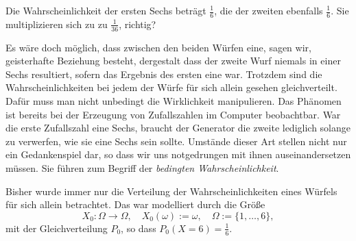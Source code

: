 Die Wahrscheinlichkeit der ersten Sechs beträgt $\tfrac{1}{6}$,
die der zweiten ebenfalls $\tfrac{1}{6}$. Sie multiplizieren sich
zu zu $\tfrac{1}{36}$, richtig?

Es wäre doch möglich, dass zwischen den beiden Würfen eine,
sagen wir, geisterhafte Beziehung besteht, dergestalt dass
der zweite Wurf niemals in einer Sechs resultiert, sofern das
Ergebnis des ersten eine war. Trotzdem sind die Wahrscheinlichkeiten bei
jedem der Würfe für sich allein gesehen gleichverteilt. Dafür muss man
nicht unbedingt die Wirklichkeit manipulieren. Das Phänomen ist bereits
bei der Erzeugung von Zufallszahlen im Computer beobachtbar. War die
erste Zufallszahl eine Sechs, braucht der Generator die zweite lediglich
solange zu verwerfen, wie sie eine Sechs sein sollte. Umstände dieser
Art stellen nicht nur ein Gedankenspiel dar, so dass wir uns notgedrungen
mit ihnen auseinandersetzen müssen. Sie führen zum Begriff der
\emph{bedingten Wahrscheinlichkeit}.

Bisher wurde immer nur die Verteilung der Wahrscheinlichkeiten eines
Würfels für sich allein betrachtet. Das war modelliert durch die Größe
\[X_0\colon\Omega\to\Omega,\quad X_0(\omega):=\omega,\quad \Omega := \{1,\ldots,6\},\]
mit der Gleichverteilung $P_0$, so dass $P_0(X=6)=\tfrac{1}{6}$.

